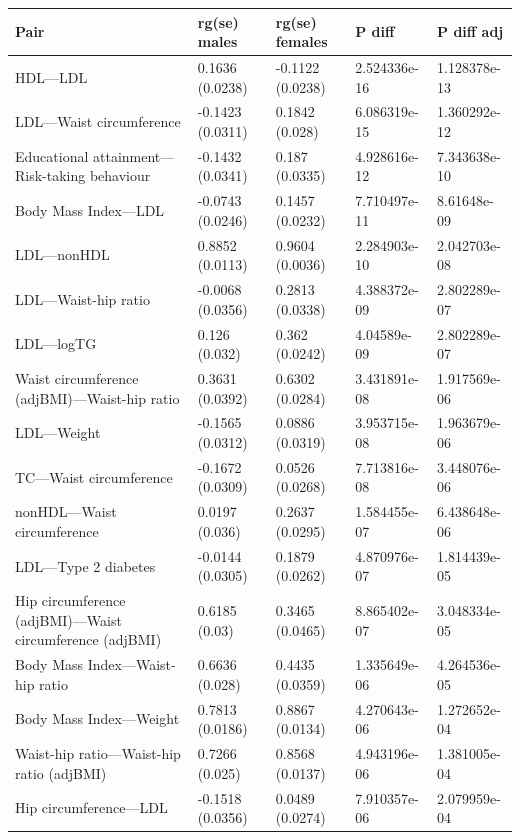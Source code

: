 \begin{table}[ht]
\centering
\begin{tabular}{lllll}
  \hline
Pair & rg(se) males & rg(se) females & P diff & P diff adj \\ 
  \hline
HDL---LDL & 0.1636 (0.0238) & -0.1122 (0.0238) & 2.524336e-16 & 1.128378e-13 \\ 
  LDL---Waist circumference & -0.1423 (0.0311) & 0.1842 (0.028) & 6.086319e-15 & 1.360292e-12 \\ 
  Educational attainment---Risk-taking behaviour & -0.1432 (0.0341) & 0.187 (0.0335) & 4.928616e-12 & 7.343638e-10 \\ 
  Body Mass Index---LDL & -0.0743 (0.0246) & 0.1457 (0.0232) & 7.710497e-11 & 8.61648e-09 \\ 
  LDL---nonHDL & 0.8852 (0.0113) & 0.9604 (0.0036) & 2.284903e-10 & 2.042703e-08 \\ 
  LDL---Waist-hip ratio & -0.0068 (0.0356) & 0.2813 (0.0338) & 4.388372e-09 & 2.802289e-07 \\ 
  LDL---logTG & 0.126 (0.032) & 0.362 (0.0242) & 4.04589e-09 & 2.802289e-07 \\ 
  Waist circumference (adjBMI)---Waist-hip ratio & 0.3631 (0.0392) & 0.6302 (0.0284) & 3.431891e-08 & 1.917569e-06 \\ 
  LDL---Weight & -0.1565 (0.0312) & 0.0886 (0.0319) & 3.953715e-08 & 1.963679e-06 \\ 
  TC---Waist circumference & -0.1672 (0.0309) & 0.0526 (0.0268) & 7.713816e-08 & 3.448076e-06 \\ 
  nonHDL---Waist circumference & 0.0197 (0.036) & 0.2637 (0.0295) & 1.584455e-07 & 6.438648e-06 \\ 
  LDL---Type 2 diabetes & -0.0144 (0.0305) & 0.1879 (0.0262) & 4.870976e-07 & 1.814439e-05 \\ 
  Hip circumference (adjBMI)---Waist circumference (adjBMI) & 0.6185 (0.03) & 0.3465 (0.0465) & 8.865402e-07 & 3.048334e-05 \\ 
  Body Mass Index---Waist-hip ratio & 0.6636 (0.028) & 0.4435 (0.0359) & 1.335649e-06 & 4.264536e-05 \\ 
  Body Mass Index---Weight & 0.7813 (0.0186) & 0.8867 (0.0134) & 4.270643e-06 & 1.272652e-04 \\ 
  Waist-hip ratio---Waist-hip ratio (adjBMI) & 0.7266 (0.025) & 0.8568 (0.0137) & 4.943196e-06 & 1.381005e-04 \\ 
  Hip circumference---LDL & -0.1518 (0.0356) & 0.0489 (0.0274) & 7.910357e-06 & 2.079959e-04 \\ 

\end{tabular}
\end{table}
